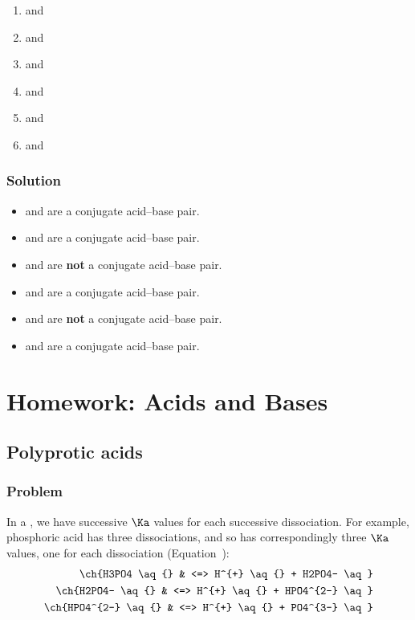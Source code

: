 \begin{enumerate}
	\item {} and 
	\item {} and 
	\item {} and 
	\item {} and 
	\item {} and 
	\item {} and 
\end{enumerate}
\subsubsection{Solution}
\begin{itemize}
	\item {\color{accent}  and } are a conjugate acid--base pair.
	\item {\color{accent}  and } are a conjugate acid--base pair.
	\item {} and  are \textbf{not} a conjugate acid--base pair.
	\item {\color{accent}  and } are a conjugate acid--base pair.
	\item {} and  are \textbf{not} a conjugate acid--base pair.
	\item {\color{accent}  and } are a conjugate acid--base pair.
\end{itemize}

\pagebreak
\section{Homework: Acids and Bases}
\subsection{Polyprotic acids}
\subsubsection{Problem}
In a  ,
we have successive \(\Ka\) values for each successive
dissociation. For example, phosphoric acid has three dissociations, and so has
correspondingly three \(\Ka\) values, one for each dissociation (Equation~):
\begin{align}
	\ch{H3PO4 \aq{}     & <=> H^{+} \aq{} + H2PO4- \aq}    \nonumber \\
	\ch{H2PO4- \aq{}    & <=> H^{+} \aq{} + HPO4^{2-} \aq} \nonumber \\
	\ch{HPO4^{2-} \aq{} & <=> H^{+} \aq{} + PO4^{3-} \aq}
	\label{eq:polyprotic}
\end{align}

